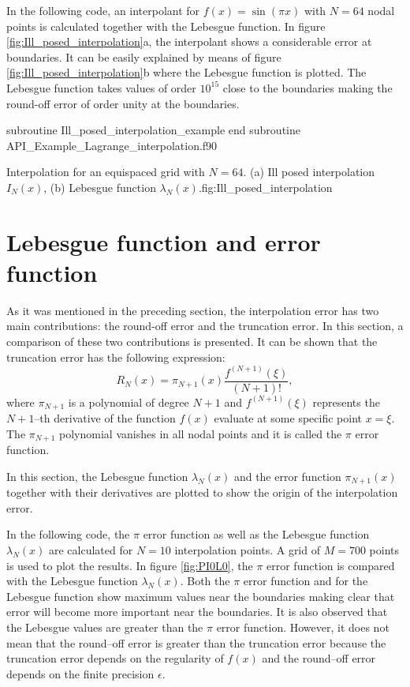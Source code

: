 In the following code,  an interpolant for $ f(x) = \sin (\pi x) $ with $ N = 64 $ nodal points is calculated together with the Lebesgue function. 
In  figure \ref{fig:Ill_posed_interpolation}a,  the interpolant shows a considerable error at boundaries. It can be easily explained by means of figure 
\ref{fig:Ill_posed_interpolation}b where the Lebesgue function is plotted. The Lebesgue function takes values of order  $  10 ^{15} $  close to the boundaries making the round-off error of order unity at the boundaries.  


\vspace{0.5cm} 
         {subroutine Ill_posed_interpolation_example}
         {end subroutine}
         {API_Example_Lagrange_interpolation.f90}


{Interpolation for an equispaced grid with $N=64$. (a) Ill posed interpolation $ I_N(x)$, (b) Lebesgue function $\lambda_N(x)$.}{fig:Ill_posed_interpolation}



\newpage  
\section{Lebesgue function and error function} 
As it was mentioned in the preceding section, 
the interpolation error has two main contributions: the round-off error and the truncation error. In this section, a comparison of these two contributions is presented. It can be shown that the truncation error has  the following expression: 
$$
    R_N(x) = \pi_{N+1}  (x) \frac{ f^{(N+1)} (\xi) } { (N+1) ! },  
$$
where $ \pi_{N+1} $ is a polynomial of degree $ N+1 $ and $ f^{(N+1)} (\xi) $ represents the $N+1$--th derivative of the function $ f(x) $ evaluate at some specific point $ x = \xi $. The $ \pi_{N+1} $ polynomial vanishes in all nodal points and it is called the $\pi$ error function. 
 
In this section, the Lebesgue function $ \lambda_N (x) $ and the error function $ \pi_{N+1}(x) $ together with their derivatives are plotted to show the origin of the interpolation error.

In the following code, the $ \pi $ error function as well as the Lebesgue function $ \lambda_N(x) $ are calculated for $ N = 10 $ interpolation points. 
A grid of $ M = 700 $ points is used to plot the results. 
In figure \ref{fig:PI0L0}, the $ \pi $ error function is compared with the Lebesgue function $ \lambda_N(x) $. 
Both the $\pi $ error function and for the Lebesgue function show maximum values near the boundaries making clear that error will become more important near the boundaries. It is also observed that 
the Lebesgue values are greater than the $\pi $ error function. However, it does not mean that the round--off error is greater than the  truncation error
because the truncation error depends on the regularity of $ f(x) $ and the round--off error depends on the finite precision $ \epsilon$. 


